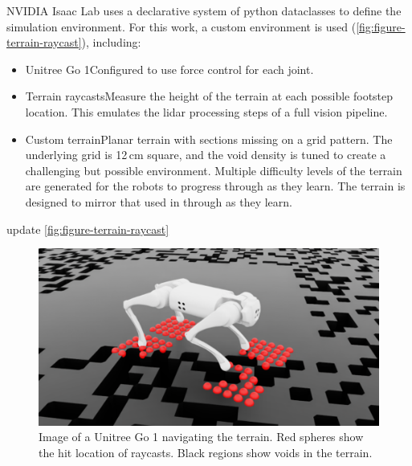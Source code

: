 NVIDIA Isaac Lab uses a declarative system of python dataclasses to
define the simulation environment. For this work, a custom
environment is used (\autoref{fig:figure-terrain-raycast}), including:

\begin{itemize}
  \item Unitree Go 1\textemdash Configured to use force control for each joint.
  \item Terrain raycasts\textemdash Measure the height of the terrain
    at each possible footstep location. This emulates the lidar
    processing steps of a full vision pipeline.
  \item Custom terrain\textemdash Planar terrain with sections
    missing on a grid pattern. The underlying grid is 12\,cm square,
    and the void density is tuned to create a challenging but
    possible environment. Multiple difficulty levels of the
    terrain are generated for the robots to progress through as
    they learn. The terrain is designed to mirror that used in
    \cite{bratta_contactnet_2024} through as they learn.
\end{itemize}

\begin{todo}
  update \autoref{fig:figure-terrain-raycast}
\end{todo}

\begin{figure}[H]
  \centering
  \includegraphics[width=0.75\linewidth]{images/figures/terrain-raycast.png}
  \caption{Image of a Unitree Go 1 navigating the terrain. Red
    spheres show the hit location of raycasts. Black regions show voids
  in the terrain.}
  \label{fig:figure-terrain-raycast}
\end{figure}
